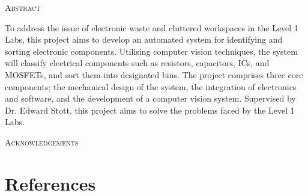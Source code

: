 \documentclass[12pt, a4paper]{article}
\begin{document}
\newpage
\vspace*{\fill}
\begin{center}
  \large\textsc{Abstract} \\
\end{center}
\noindent To address the issue of electronic waste and cluttered workspaces in the Level 1 Labs, this project aims to develop an automated system for identifying and sorting electronic components.
Utilising computer vision techniques, the system will classify electrical components such as resistors, capacitors, ICs, and MOSFETs, and sort them into designated bins.
The project comprises three core components; the mechanical design of the system, the integration of electronics and software, and the development of a computer vision system.
Supervised by Dr. Edward Stott, this project aims to solve the problems faced by the Level 1 Labs. \\
\vspace*{\fill}

\newpage
\vspace*{\fill}
\begin{center}
  \large\textsc{Acknowledgements} \\
\end{center}
\lipsum[1-2]
\vspace*{\fill}
\newpage

{\hypersetup{hidelinks}\tableofcontents\thispagestyle{fancy}}
\listoftodos
\newpage




% 

% 

% 
% 


\section{References}




\end{document}
